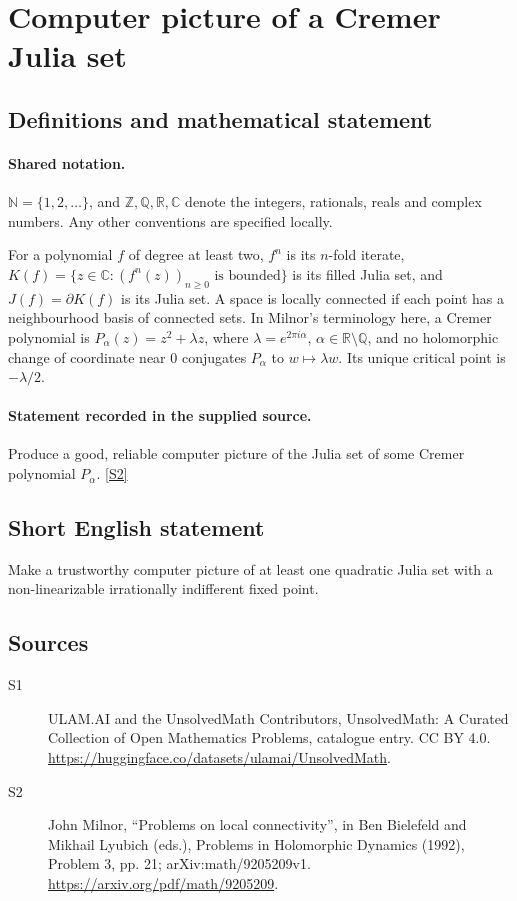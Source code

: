 \documentclass[11pt]{article}
\newcommand{\sref}[2]{\hyperlink{source:#1:#2}{[S#2]}}
\begin{document}
\section{Computer picture of a Cremer Julia set}\label{statement}

\subsection{Definitions and mathematical statement}

\paragraph{Shared notation.}$\mathbb N=\{1,2,\ldots\}$, and $\mathbb Z,\mathbb Q,\mathbb R,\mathbb C$ denote the integers, rationals, reals and complex numbers. Any other conventions are specified locally.


For a polynomial $f$ of degree at least two, $f^n$ is its $n$-fold iterate, $K(f)=\{z\in\mathbb C:(f^n(z))_{n\geq0}\text{ is bounded}\}$ is its filled Julia set, and $J(f)=\partial K(f)$ is its Julia set. A space is locally connected if each point has a neighbourhood basis of connected sets. In Milnor's terminology here, a Cremer polynomial is $P_\alpha(z)=z^2+\lambda z$, where $\lambda=e^{2\pi i\alpha}$, $\alpha\in\mathbb R\setminus\mathbb Q$, and no holomorphic change of coordinate near $0$ conjugates $P_\alpha$ to $w\mapsto\lambda w$. Its unique critical point is $-\lambda/2$.
\paragraph{Statement recorded in the supplied source.}
Produce a good, reliable computer picture of the Julia set of some Cremer polynomial $P_\alpha$. \sref{statement}{2}
\subsection{Short English statement}
Make a trustworthy computer picture of at least one quadratic Julia set with a non-linearizable irrationally indifferent fixed point.
\subsection{Sources}
\begin{description}
\item[\hypertarget{source:statement:1}{S1}] ULAM.AI and the UnsolvedMath Contributors, UnsolvedMath: A Curated Collection of Open Mathematics Problems, catalogue entry. CC BY 4.0. \url{https://huggingface.co/datasets/ulamai/UnsolvedMath}.
\item[\hypertarget{source:statement:2}{S2}] John Milnor, ``Problems on local connectivity'', in Ben Bielefeld and Mikhail Lyubich (eds.), Problems in Holomorphic Dynamics (1992), Problem 3, pp. 21; arXiv:math/9205209v1. \url{https://arxiv.org/pdf/math/9205209}.
\end{description}
\label{end:statement}
\end{document}
